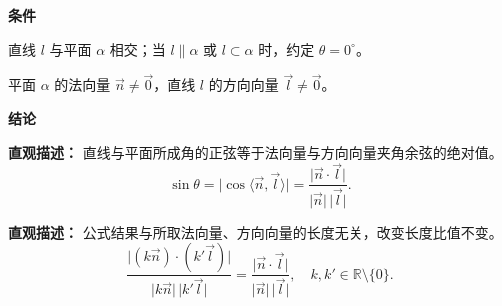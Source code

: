 \begin{statementbox}

	\textbf{\textcolor{CStatement}{条件}}

	\begin{description}[style=nextline, leftmargin=2.8em, labelsep=0.5em, itemsep=0.35em]
		\item[\textbf{\textcolor{CStatement}{条件1（位置关系）：}}]
		      直线 $l$ 与平面 $\alpha$ 相交；当 $l\parallel\alpha$ 或 $l\subset\alpha$ 时，约定 $\theta=0^\circ$。

		\item[\textbf{\textcolor{CStatement}{条件2（向量非零）：}}]
		      平面 $\alpha$ 的法向量 $\vec{n}\neq\vec{0}$，直线 $l$ 的方向向量 $\vec{l}\neq\vec{0}$。
	\end{description}

	\medskip

	\textbf{\textcolor{CStatement}{结论}}

	\begin{description}[style=nextline, leftmargin=2.8em, labelsep=0.5em, itemsep=0.45em]
		\item[\textbf{\textcolor{CStatement}{结论一（线面角正弦公式）：}}]
		      \textbf{\textcolor{CStatement}{直观描述：}}
		      直线与平面所成角的正弦等于法向量与方向向量夹角余弦的绝对值。
		      \[
			      \sin\theta
			      = \lvert\cos\langle\vec{n},\vec{l}\rangle\rvert
			      = \frac{\lvert\vec{n}\cdot\vec{l}\rvert}{\lvert\vec{n}\rvert\,\lvert\vec{l}\rvert}.
		      \]

		\item[\textbf{\textcolor{CStatement}{推广结论（长度无关性）：}}]
		      \textbf{\textcolor{CStatement}{直观描述：}}
		      公式结果与所取法向量、方向向量的长度无关，改变长度比值不变。
		      \[
			      \frac{\lvert(k\vec{n})\cdot(k'\vec{l})\rvert}{\lvert k\vec{n}\rvert\,\lvert k'\vec{l}\rvert}
			      = \frac{\lvert\vec{n}\cdot\vec{l}\rvert}{\lvert\vec{n}\rvert\,\lvert\vec{l}\rvert},
			      \quad k,k'\in\mathbb{R}\setminus\{0\}.
		      \]
	\end{description}

\end{statementbox}